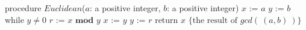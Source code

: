 
\begin{algorithm}[caption={Euclidean algorithm for calculating greatest common divisor}]
    procedure $Euclidean$($a$: a positive integer, $b$: a positive integer)
    $x$ := $a$
    $y$ := $b$
    while $y \neq 0$
      $r$ := $x \textbf{ mod } y$
      $x$ := $y$
      $y$ := $r$
    return $x$ $\{ \textrm{the result of } gcd(~(a,b)~)\} $
\end{algorithm}